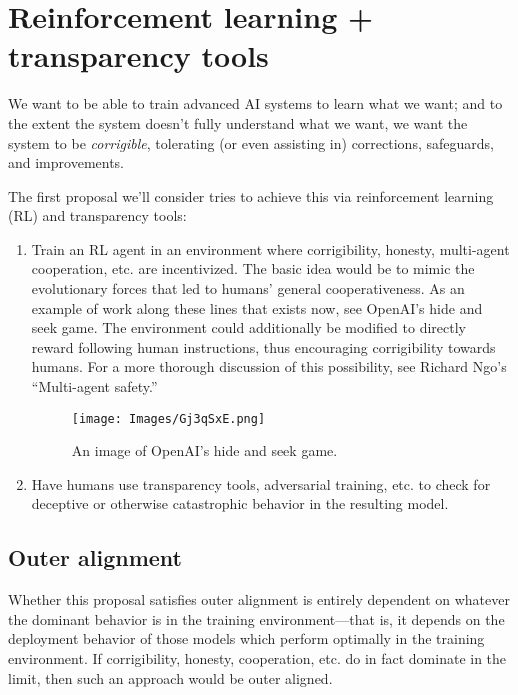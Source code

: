 \documentclass[
  onecolumn,
  natbib,
]{miri-tech-article}
\begin{document}
\section{Reinforcement learning + transparency tools}
\label{sec:1}

We want to be able to train advanced AI systems to learn what we want; and to the extent the system doesn't fully understand what we want, we want the system to be \emph{corrigible}, tolerating (or even assisting in) corrections, safeguards, and improvements.\cite{corrigibility}\cite{mechanistic}

The first proposal we'll consider tries to achieve this via reinforcement learning (RL) and transparency tools:

\begin{enumerate}
\item Train an RL agent in an environment where corrigibility, honesty, multi-agent cooperation, etc. are incentivized. The basic idea would be to mimic the evolutionary forces that led to humans' general cooperativeness. As an example of work along these lines that exists now, see OpenAI's hide and seek game.\cite{tool_use} The environment could additionally be modified to directly reward following human instructions, thus encouraging corrigibility towards humans. For a more thorough discussion of this possibility, see Richard Ngo's ``Multi-agent safety.''\cite{multi_agent_safety}

\vspace{4mm}

\begin{figure}[h!]
  \centering
  \texttt{[image: Images/Gj3qSxE.png]}
  \caption{An image of OpenAI's hide and seek game.}
\end{figure}

\vspace{2mm}

\item Have humans use transparency tools,\cite{circuits} adversarial training, etc. to check for deceptive\cite{risks} or otherwise catastrophic\cite{catastrophes} behavior in the resulting model.
\end{enumerate}

\subsection{Outer alignment} Whether this proposal satisfies outer alignment is entirely dependent on whatever the dominant behavior is in the training environment---that is, it depends on the deployment behavior of those models which perform optimally in the training environment. If corrigibility, honesty, cooperation, etc. do in fact dominate in the limit, then such an approach would be outer aligned. 
\end{document}

